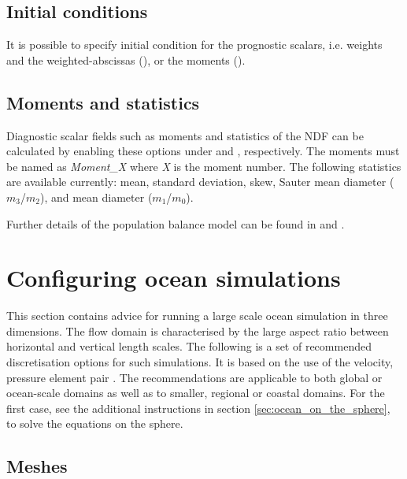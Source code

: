 \subsection{Initial conditions}
It is possible to specify initial condition for the prognostic scalars, i.e. weights and the weighted-abscissas (), or the moments (). 

\subsection{Moments and statistics}
Diagnostic scalar fields such as moments and statistics of the NDF can be calculated by enabling these options under  and , respectively. The moments must be named as \emph{Moment\_X} where \emph{X} is the moment number. The following statistics are available currently: mean, standard deviation, skew, Sauter mean diameter ($m_3$/$m_2$), and mean diameter ($m_1$/$m_0$). 

Further details of the population balance model can be found in \citet{bhutani2016polydispersed} and \citet{bhutani2016}.

\section{Configuring ocean simulations}
\label{sec:large-scale-ocean}

This section contains advice for running a large scale ocean simulation in
three dimensions. The flow domain is characterised by the large aspect ratio
between horizontal and vertical length scales. The following is a set of
recommended discretisation options for such simulations. It is based on the use
of the \PoDGPt velocity, pressure element pair \citep{cotter2009}. The
recommendations are applicable to both global or ocean-scale domains as well as
to smaller, regional or coastal domains. For the first case, see the additional
instructions in section \ref{sec:ocean_on_the_sphere}, to solve the equations
on the sphere.

\subsection{Meshes}

